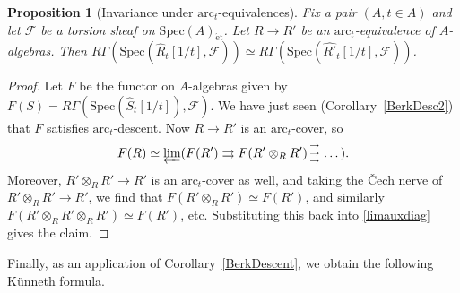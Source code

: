 \documentclass[reqno]{amsart}
\newcommand{\triplearrows}{\begin{smallmatrix} \to \\ \to \\ 
\to \end{smallmatrix} }
\newcommand{\sF}{\mathcal{F}}
\newcommand{\spec}{\mathrm{Spec}}
\newcommand{\et}{\mathrm{\acute{e}t}}
\newcommand{\arc}{\mathrm{arc}}
\newtheorem{proposition}[theorem]{Proposition}
\theoremstyle{definition}
\begin{document}
\begin{proposition}[Invariance under $\arc_t$-equivalences] 
\label{arctinvariance}
Fix a pair $(A, t \in A)$ and let $\sF$ be a torsion sheaf on $\spec(A)_{\et}$. 
Let $R \to R'$ be an $\arc_t$-equivalence of $A$-algebras. 
Then $R \Gamma( \spec(\hat{R}_t[1/t], \sF)) \simeq 
R \Gamma( \spec(\widehat{R'}_t[1/t], \sF))$. 
\end{proposition} 
\begin{proof} 
Let $F$ be the functor on $A$-algebras given by $F(S) = R \Gamma( \spec(
\hat{S}_t[1/t]), \sF)$. 
We have just seen (Corollary~\ref{BerkDesc2}) that $F$ satisfies
$\arc_t$-descent. 
Now $R \to R'$ is an 
$\arc_t$-cover, so \begin{equation} \label{limauxdiag} F(R) \simeq \varprojlim ( F(R') \rightrightarrows F(R'
\otimes_R R') \triplearrows \dots ). \end{equation}Moreover, 
$R' \otimes_R R'  \to R'$ is an $\arc_t$-cover as well, and taking the \v{C}ech
nerve of $R' \otimes_R R' \to R'$, we find that 
$F( R' \otimes_R R') \simeq F(R')$, and similarly $F(R' \otimes_R R' \otimes_R
R') \simeq F(R')$, etc. Substituting this back into 
\eqref{limauxdiag} gives the claim. 
\end{proof} 



Finally, as an application of Corollary~\ref{BerkDescent}, we obtain the following K\"unneth formula. 
\end{document}
